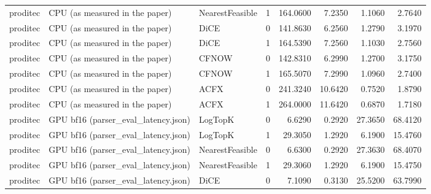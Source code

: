 \begin{tabular}{lllrrrrr}
proditec &      CPU (as measured in the paper) & NearestFeasible &            1 &       164.0600 &                   7.2350 &                    1.1060 &                     2.7640 \\
proditec &      CPU (as measured in the paper) &            DiCE &            0 &       141.8630 &                   6.2560 &                    1.2790 &                     3.1970 \\
proditec &      CPU (as measured in the paper) &            DiCE &            1 &       164.5390 &                   7.2560 &                    1.1030 &                     2.7560 \\
proditec &      CPU (as measured in the paper) &           CFNOW &            0 &       142.8310 &                   6.2990 &                    1.2700 &                     3.1750 \\
proditec &      CPU (as measured in the paper) &           CFNOW &            1 &       165.5070 &                   7.2990 &                    1.0960 &                     2.7400 \\
proditec &      CPU (as measured in the paper) &            ACFX &            0 &       241.3240 &                  10.6420 &                    0.7520 &                     1.8790 \\
proditec &      CPU (as measured in the paper) &            ACFX &            1 &       264.0000 &                  11.6420 &                    0.6870 &                     1.7180 \\
proditec & GPU bf16 (parser\_eval\_latency.json) &         LogTopK &            0 &         6.6290 &                   0.2920 &                   27.3650 &                    68.4120 \\
proditec & GPU bf16 (parser\_eval\_latency.json) &         LogTopK &            1 &        29.3050 &                   1.2920 &                    6.1900 &                    15.4760 \\
proditec & GPU bf16 (parser\_eval\_latency.json) & NearestFeasible &            0 &         6.6300 &                   0.2920 &                   27.3630 &                    68.4070 \\
proditec & GPU bf16 (parser\_eval\_latency.json) & NearestFeasible &            1 &        29.3060 &                   1.2920 &                    6.1900 &                    15.4750 \\
proditec & GPU bf16 (parser\_eval\_latency.json) &            DiCE &            0 &         7.1090 &                   0.3130 &                   25.5200 &                    63.7990 \\

\end{tabular}
